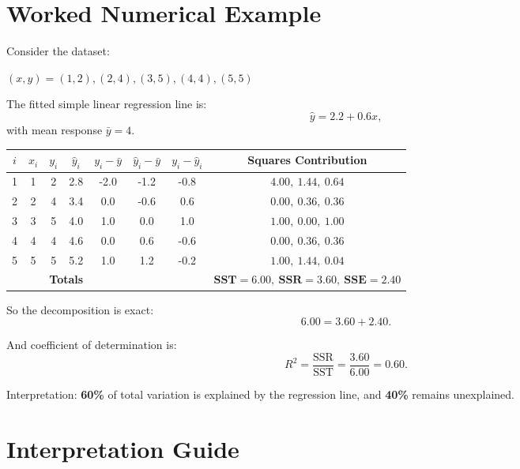 \documentclass[12pt,a4paper]{article}
\begin{document}
\section{Worked Numerical Example}

Consider the dataset:
\begin{center}
$ (x,y) = (1,2),(2,4),(3,5),(4,4),(5,5) $
\end{center}

The fitted simple linear regression line is:
\begin{equation}
\hat{y} = 2.2 + 0.6x,
\end{equation}
with mean response $\bar{y}=4$.

\begin{center}
\small
\begin{tabular}{cccccccc}
\toprule
$i$ & $x_i$ & $y_i$ & $\hat y_i$ & $y_i-\bar y$ & $\hat y_i-\bar y$ & $y_i-\hat y_i$ & Squares Contribution \\
\midrule
1 & 1 & 2 & 2.8 & -2.0 & -1.2 & -0.8 & $4.00,\ 1.44,\ 0.64$ \\
2 & 2 & 4 & 3.4 &  0.0 & -0.6 &  0.6 & $0.00,\ 0.36,\ 0.36$ \\
3 & 3 & 5 & 4.0 &  1.0 &  0.0 &  1.0 & $1.00,\ 0.00,\ 1.00$ \\
4 & 4 & 4 & 4.6 &  0.0 &  0.6 & -0.6 & $0.00,\ 0.36,\ 0.36$ \\
5 & 5 & 5 & 5.2 &  1.0 &  1.2 & -0.2 & $1.00,\ 1.44,\ 0.04$ \\
\midrule
\multicolumn{4}{r}{\textbf{Totals}} & & & &
$\textbf{SST}=6.00,\ \textbf{SSR}=3.60,\ \textbf{SSE}=2.40$ \\
\bottomrule
\end{tabular}
\end{center}

So the decomposition is exact:
\begin{equation}
6.00 = 3.60 + 2.40.
\end{equation}

And coefficient of determination is:
\begin{equation}
R^2 = \frac{\text{SSR}}{\text{SST}} = \frac{3.60}{6.00} = 0.60.
\end{equation}

Interpretation: \textbf{60\%} of total variation is explained by the regression line, and \textbf{40\%} remains unexplained.

\section{Interpretation Guide}
\end{document}
